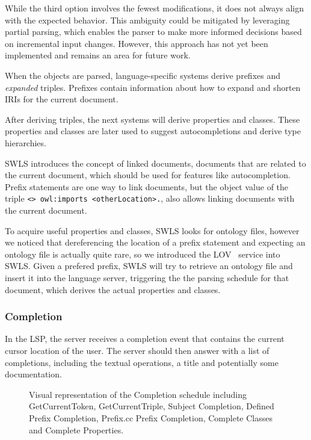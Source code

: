 While the third option involves the fewest modifications, it does not always align with the expected behavior.
This ambiguity could be mitigated by leveraging partial parsing, which enables the parser to make more informed decisions based on incremental input changes.
However, this approach has not yet been implemented and remains an area for future work.

When the objects are parsed, language-specific systems derive prefixes and \textit{expanded} triples. 
Prefixes contain information about how to expand and shorten IRIs for the current document.

After deriving triples, the next systems will derive properties and classes.
These properties and classes are later used to suggest autocompletions and derive type hierarchies.

SWLS introduces the concept of linked documents, documents that are related to the current document, which should be used for features like autocompletion.
Prefix statements are one way to link documents, but the object value of the triple \texttt{<> owl:imports <otherLocation>.}, also allows linking documents with the current document.

To acquire useful properties and classes, SWLS looks for ontology files, however we noticed that dereferencing the location of a prefix statement and expecting an ontology file is actually quite rare, 
so we introduced the LOV~\cite{LOV2017} service into SWLS.
Given a prefered prefix, SWLS will try to retrieve an ontology file and insert it into the language server, triggering the the parsing schedule for that document, which derives the actual properties and classes.


\subsubsection{Completion}

In the LSP, the server receives a completion event that contains the current cursor location of the user.
The server should then answer with a list of completions, including the textual operations, a title and potentially some documentation.

\begin{figure}[!ht]
 \centering
  \caption{Visual representation of the Completion schedule including GetCurrentToken, GetCurrentTriple, Subject Completion, Defined Prefix Completion, Prefix.cc Prefix Completion, Complete Classes and Complete Properties.}\label{fig:Completion}
\end{figure}


